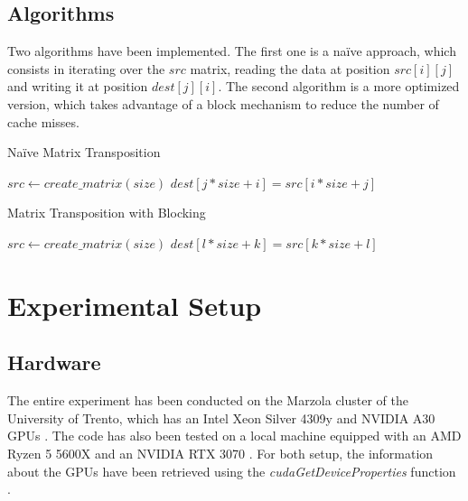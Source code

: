 \documentclass{IEEEconf}
\begin{document}
\subsection{Algorithms}
Two algorithms have been implemented. The first one is a na\"{i}ve approach, which
consists in iterating over the $src$ matrix, reading the data at position $src[i][j]$ and writing it at position $dest [j][i]$. The second algorithm is a more optimized version, which takes advantage of a block mechanism to reduce the number of cache misses.
\begin{algorithm}
    \caption{Na\"{i}ve Matrix Transposition}
    \begin{algorithmic}[1]
        \State $src \gets create\_matrix(size)$
                \State $dest[j * size + i] = src[i * size + j]$
            \EndFor
        \EndFor
    \end{algorithmic}
\end{algorithm}
\begin{algorithm}
    \caption{Matrix Transposition with Blocking}
    \begin{algorithmic}[1]
        \State $src \gets create\_matrix(size)$
                 
                        \State $dest[l * size + k] = src[k * size + l]$
                    \EndFor
                \EndFor
            \EndFor
        \EndFor
    \end{algorithmic}
\end{algorithm}
\section{Experimental Setup}
\subsection{Hardware} \label{hardware}
The entire experiment has been conducted on the Marzola cluster of the University of Trento, 
which has an Intel Xeon Silver 4309y \cite{intel:xeon} and NVIDIA A30 GPUs \cite{nvidia:a30}.
The code has also been tested on a local machine equipped with an AMD Ryzen 5 5600X 
\cite{amd:ryzen} and an NVIDIA RTX 3070 \cite{nvidia:rtx3070}.
For both setup, the information about the GPUs have been retrieved using the 
\textit{cudaGetDeviceProperties} function \cite{nvidia:cudaDeviceProp}.
\end{document}
